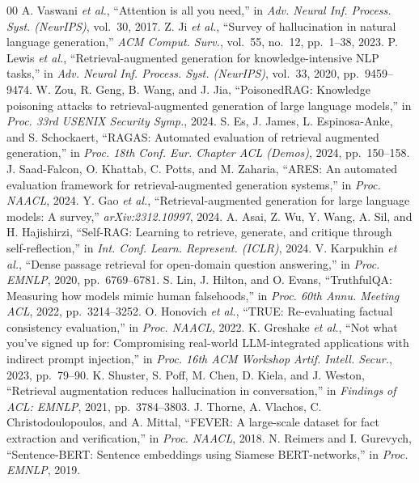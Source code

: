 \documentclass[conference]{IEEEtran}
\begin{document}
\begin{thebibliography}{00}
 A. Vaswani \emph{et al.}, ``Attention is all you need,'' in \emph{Adv. Neural Inf. Process. Syst. (NeurIPS)}, vol.~30, 2017.
 Z. Ji \emph{et al.}, ``Survey of hallucination in natural language generation,'' \emph{ACM Comput. Surv.}, vol.~55, no.~12, pp.~1--38, 2023.
 P. Lewis \emph{et al.}, ``Retrieval-augmented generation for knowledge-intensive NLP tasks,'' in \emph{Adv. Neural Inf. Process. Syst. (NeurIPS)}, vol.~33, 2020, pp.~9459--9474.
 W. Zou, R. Geng, B. Wang, and J. Jia, ``PoisonedRAG: Knowledge poisoning attacks to retrieval-augmented generation of large language models,'' in \emph{Proc. 33rd USENIX Security Symp.}, 2024.
 S. Es, J. James, L. Espinosa-Anke, and S. Schockaert, ``RAGAS: Automated evaluation of retrieval augmented generation,'' in \emph{Proc. 18th Conf. Eur. Chapter ACL (Demos)}, 2024, pp.~150--158.
 J. Saad-Falcon, O. Khattab, C. Potts, and M. Zaharia, ``ARES: An automated evaluation framework for retrieval-augmented generation systems,'' in \emph{Proc. NAACL}, 2024.
 Y. Gao \emph{et al.}, ``Retrieval-augmented generation for large language models: A survey,'' \emph{arXiv:2312.10997}, 2024.
 A. Asai, Z. Wu, Y. Wang, A. Sil, and H. Hajishirzi, ``Self-RAG: Learning to retrieve, generate, and critique through self-reflection,'' in \emph{Int. Conf. Learn. Represent. (ICLR)}, 2024.
 V. Karpukhin \emph{et al.}, ``Dense passage retrieval for open-domain question answering,'' in \emph{Proc. EMNLP}, 2020, pp.~6769--6781.
 S. Lin, J. Hilton, and O. Evans, ``TruthfulQA: Measuring how models mimic human falsehoods,'' in \emph{Proc. 60th Annu. Meeting ACL}, 2022, pp.~3214--3252.
 O. Honovich \emph{et al.}, ``TRUE: Re-evaluating factual consistency evaluation,'' in \emph{Proc. NAACL}, 2022.
 K. Greshake \emph{et al.}, ``Not what you've signed up for: Compromising real-world LLM-integrated applications with indirect prompt injection,'' in \emph{Proc. 16th ACM Workshop Artif. Intell. Secur.}, 2023, pp.~79--90.
 K. Shuster, S. Poff, M. Chen, D. Kiela, and J. Weston, ``Retrieval augmentation reduces hallucination in conversation,'' in \emph{Findings of ACL: EMNLP}, 2021, pp.~3784--3803.
 J. Thorne, A. Vlachos, C. Christodoulopoulos, and A. Mittal, ``FEVER: A large-scale dataset for fact extraction and verification,'' in \emph{Proc. NAACL}, 2018.
 N. Reimers and I. Gurevych, ``Sentence-BERT: Sentence embeddings using Siamese BERT-networks,'' in \emph{Proc. EMNLP}, 2019.
\end{thebibliography}
\end{document}
